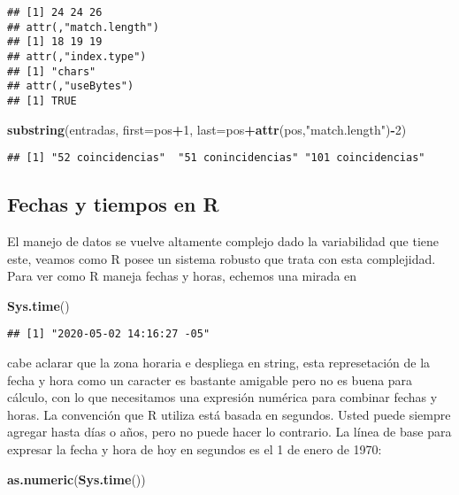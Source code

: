 \documentclass[]{article}
\newenvironment{Shaded}{\begin{snugshade}}{\end{snugshade}}
\newcommand{\KeywordTok}[1]{\textcolor[rgb]{0.13,0.29,0.53}{\textbf{#1}}}
\newcommand{\DataTypeTok}[1]{\textcolor[rgb]{0.13,0.29,0.53}{#1}}
\newcommand{\DecValTok}[1]{\textcolor[rgb]{0.00,0.00,0.81}{#1}}
\newcommand{\StringTok}[1]{\textcolor[rgb]{0.31,0.60,0.02}{#1}}
\newcommand{\OperatorTok}[1]{\textcolor[rgb]{0.81,0.36,0.00}{\textbf{#1}}}
\newcommand{\NormalTok}[1]{#1}
\begin{document}
\begin{verbatim}
## [1] 24 24 26
## attr(,"match.length")
## [1] 18 19 19
## attr(,"index.type")
## [1] "chars"
## attr(,"useBytes")
## [1] TRUE
\end{verbatim}

\begin{Shaded}
\begin{Highlighting}[]
\KeywordTok{substring}\NormalTok{(entradas, }\DataTypeTok{first=}\NormalTok{pos}\OperatorTok{+}\DecValTok{1}\NormalTok{, }\DataTypeTok{last=}\NormalTok{pos}\OperatorTok{+}\KeywordTok{attr}\NormalTok{(pos,}\StringTok{"match.length"}\NormalTok{)}\OperatorTok{-}\DecValTok{2}\NormalTok{)}
\end{Highlighting}
\end{Shaded}

\begin{verbatim}
## [1] "52 coincidencias"  "51 conincidencias" "101 coincidencias"
\end{verbatim}

\subsection{Fechas y tiempos en R}\label{fechas-y-tiempos-en-r}

El manejo de datos se vuelve altamente complejo dado la variabilidad que
tiene este, veamos como R posee un sistema robusto que trata con esta
complejidad. Para ver como R maneja fechas y horas, echemos una mirada
en

\begin{Shaded}
\begin{Highlighting}[]
\KeywordTok{Sys.time}\NormalTok{()}
\end{Highlighting}
\end{Shaded}

\begin{verbatim}
## [1] "2020-05-02 14:16:27 -05"
\end{verbatim}

cabe aclarar que la zona horaria e despliega en string, esta
represetación de la fecha y hora como un caracter es bastante amigable
pero no es buena para cálculo, con lo que necesitamos una expresión
numérica para combinar fechas y horas. La convención que R utiliza está
basada en segundos. Usted puede siempre agregar hasta días o años, pero
no puede hacer lo contrario. La línea de base para expresar la fecha y
hora de hoy en segundos es el 1 de enero de 1970:

\begin{Shaded}
\begin{Highlighting}[]
\KeywordTok{as.numeric}\NormalTok{(}\KeywordTok{Sys.time}\NormalTok{())}
\end{Highlighting}
\end{Shaded}
\end{document}
